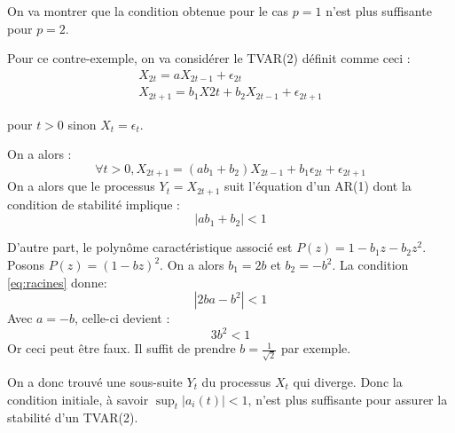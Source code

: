 \documentclass[a4paper,french]{article}
\begin{document}
On va montrer que la condition obtenue pour le cas $p=1$ n'est plus suffisante pour $p=2$.

Pour ce contre-exemple, on va considérer le TVAR(2) définit comme ceci :
\begin{align*}
X_{2t} = a X_{2t-1} + \epsilon_{2t} \\
X_{2t+1} = b_1 X{2t} + b_2 X_{2t-1} + \epsilon_{2t+1}
\end{align*}

pour $t>0$ sinon $X_t = \epsilon_t$.

On a alors :
$$
\forall t>0, X_{2t+1} = (ab_1 + b_2) X_{2t-1} + b_1 \epsilon_{2t} + \epsilon_{2t+1}
$$
On a alors que le processus $Y_t = X_{2t+1}$ suit l'équation d'un AR(1) dont la condition de stabilité implique :
\begin{equation} \label{eq:racines}
|ab_1 + b_2| < 1
\tag{*}
\end{equation}

D'autre part, le polynôme caractéristique associé est $P(z) = 1 - b_1 z - b_2 z^2$. Posons $P(z) = (1-bz)^2$. On a alors $b_1 = 2b$ et $b_2 = -b^2$.
La condition \eqref{eq:racines} donne:
$$
|2ba-b^2| <1
$$
Avec $a = -b$, celle-ci devient :
$$
3b^2 < 1
$$
Or ceci peut être faux. Il suffit de prendre $b=\frac{1}{\sqrt{2}}$ par exemple.

On a donc trouvé une sous-suite $Y_t$ du processus $X_t$ qui diverge. Donc la condition initiale, à savoir $\sup_t|a_i(t)|<1$, n'est plus suffisante pour assurer la stabilité d'un TVAR(2).
\end{document}
